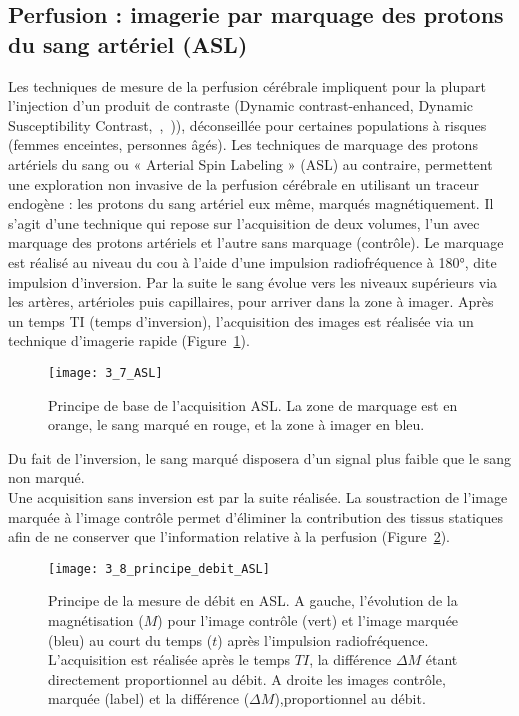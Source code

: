 \subsection{Perfusion : imagerie par marquage des protons du sang artériel (ASL)}
Les techniques de mesure de la perfusion cérébrale impliquent pour la plupart l’injection d’un
produit de contraste (Dynamic contrast-enhanced, Dynamic Susceptibility Contrast,~\cite{Calamante2010},~\cite{OConnor2011})),
déconseillée pour certaines populations à risques (femmes enceintes, personnes âgés). Les techniques
de marquage des protons artériels du sang ou « Arterial Spin Labeling » (ASL) au contraire, permettent
une exploration non invasive de la perfusion cérébrale en utilisant un traceur endogène : les protons
du sang artériel eux même, marqués magnétiquement. Il s’agit d’une technique qui repose sur
l’acquisition de deux volumes, l’un avec marquage des protons artériels et l’autre sans marquage
(contrôle). Le marquage est réalisé au niveau du cou à l’aide d’une impulsion radiofréquence à 180°,
dite impulsion d’inversion. Par la suite le sang évolue vers les niveaux supérieurs via les artères,
artérioles puis capillaires, pour arriver dans la zone à imager. Après un temps TI (temps d’inversion),
l’acquisition des images est réalisée via un technique d’imagerie rapide (Figure~\ref{fig:3_7_ASL}). 
\begin{figure}[!t]
\centering
\texttt{[image: 3\_7\_ASL]}
\caption{Principe de base de l'acquisition ASL. La zone de marquage est en orange, le sang marqué en rouge, et la zone à
imager en bleu.}
\label{fig:3_7_ASL}	
\end{figure}
Du fait de
l’inversion, le sang marqué disposera d’un signal plus faible que le sang non marqué.\\
Une acquisition sans inversion est par la suite réalisée. La soustraction de l’image marquée à
l’image contrôle permet d’éliminer la contribution des tissus statiques afin de ne conserver que
l’information relative à la perfusion (Figure~\ref{fig:3_8_principe_debit_ASL}).
\begin{figure}[!t]
\centering
\texttt{[image: 3\_8\_principe\_debit\_ASL]}
\caption{Principe de la mesure de débit en ASL. A gauche, l’évolution de la magnétisation ($M$) pour l’image contrôle (vert) et
l’image marquée (bleu) au court du temps ($t$) après l’impulsion radiofréquence. L’acquisition est réalisée après le temps $TI$, la
différence $\Delta M$ étant directement proportionnel au débit. A droite les images contrôle, marquée (label) et la différence ($\Delta M$),proportionnel au débit.}
\label{fig:3_8_principe_debit_ASL}	
\end{figure}
